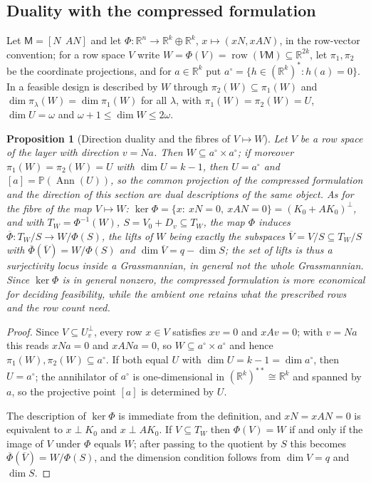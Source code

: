 \documentclass[journal]{IEEEtran}
\theoremstyle{plainn}
\newtheorem{prop}[thm]{Proposition}
\theoremstyle{remark}
\newcommand{\row}{\operatorname{row}}
\newcommand{\Ann}{\operatorname{Ann}}
\begin{document}
\subsection{Duality with the compressed formulation}
\label{sec3:sub:duality}
Let $\mathsf{M}=[N\ \ AN]$ and let $\Phi\colon\mathbb{R}^n\to\mathbb{R}^{k}\oplus\mathbb{R}^{k}$,
$x\mapsto(xN,xAN)$, in the row-vector convention; for a row space $V$ write
$W=\Phi(V)=\row(V\mathsf{M})\subseteq\mathbb{R}^{2k}$, let $\pi_1,\pi_2$ be the coordinate projections,
and for $a\in\mathbb{R}^k$ put $a^\circ=\{h\in(\mathbb{R}^k)^*: h(a)=0\}$. In \cite{companion2} a
feasible design is described by $W$ through $\pi_2(W)\subseteq\pi_1(W)$ and
$\dim\pi_\lambda(W)=\dim\pi_1(W)$ for all $\lambda$, with $\pi_1(W)=\pi_2(W)=U$, $\dim U=\omega$ and
$\omega+1\le\dim W\le 2\omega$.

\begin{prop}[Direction duality and the fibres of $V\mapsto W$]
\label{sec3:prop:duality}
\label{sec3:prop:fibres}
\label{sec3:rem:noalternative}
Let $V$ be a row space of the layer with direction $v=Na$. Then $W\subseteq a^\circ\times a^\circ$; if
moreover $\pi_1(W)=\pi_2(W)=U$ with $\dim U=k-1$, then $U=a^\circ$ and
$[a]=\mathbb{P}(\Ann(U))$, so the common projection of the compressed formulation and the direction of
this section are dual descriptions of the same object. As for the fibre of the map $V\mapsto W$:
$\ker\Phi=\{x:\ xN=0,\ xAN=0\}=(K_0+AK_0)^\perp$, and with $T_W=\Phi^{-1}(W)$, $S=V_0+D_v\subseteq T_W$,
the map $\Phi$ induces $\overline{\Phi}\colon T_W/S\to W/\Phi(S)$, the lifts of $W$ being exactly the
subspaces $\overline{V}=V/S\subseteq T_W/S$ with $\overline{\Phi}(\overline{V})=W/\Phi(S)$ and
$\dim\overline{V}=q-\dim S$; the set of lifts is thus a \emph{surjectivity locus} inside a
Grassmannian, in general not the whole Grassmannian. Since $\ker\Phi$ is in general nonzero, the
compressed formulation is more economical for deciding feasibility, while the ambient one retains what
the prescribed rows and the row count need.
\end{prop}
\begin{proof}
Since $V\subseteq U_v^\perp$, every row $x\in V$ satisfies $xv=0$ and $xAv=0$; with $v=Na$ this reads
$xNa=0$ and $xANa=0$, so $W\subseteq a^\circ\times a^\circ$ and hence
$\pi_1(W),\pi_2(W)\subseteq a^\circ$. If both equal $U$ with $\dim U=k-1=\dim a^\circ$, then
$U=a^\circ$; the annihilator of $a^\circ$ is one-dimensional in $(\mathbb{R}^k)^{**}\cong\mathbb{R}^k$
and spanned by $a$, so the projective point $[a]$ is determined by $U$.

The description of $\ker\Phi$ is immediate from the definition, and $xN=xAN=0$ is equivalent to
$x\perp K_0$ and $x\perp AK_0$. If $V\subseteq T_W$ then $\Phi(V)=W$ if and only if the image of $V$
under $\Phi$ equals $W$; after passing to the quotient by $S$ this becomes
$\overline\Phi(\overline V)=W/\Phi(S)$, and the dimension condition follows from $\dim V=q$ and
$\dim S$.
\end{proof}
\end{document}

